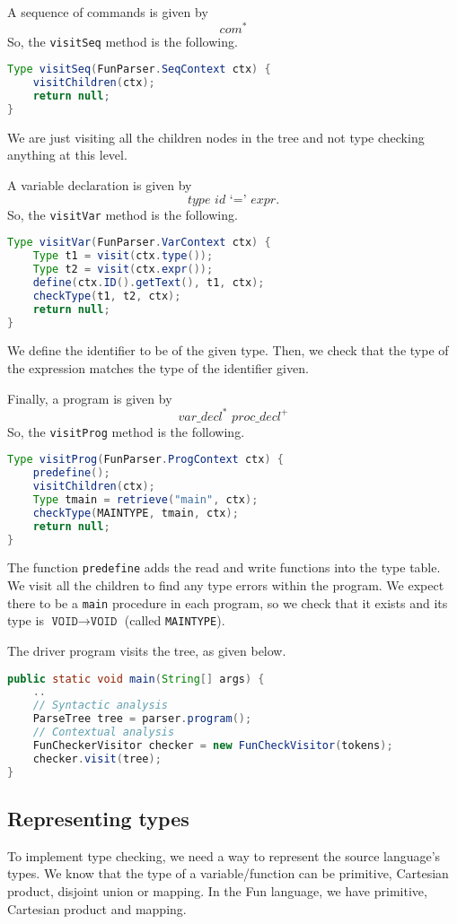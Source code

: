 \documentclass[a4paper, openany]{memoir}
\begin{document}
A sequence of commands is given by
\[\textit{com}^*\]
So, the \texttt{visitSeq} method is the following.
\begin{lstlisting}[language=java]
Type visitSeq(FunParser.SeqContext ctx) {
    visitChildren(ctx);
    return null;
}
\end{lstlisting}
We are just visiting all the children nodes in the tree and not type checking anything at this level.

A variable declaration is given by
\[\textit{type id} \text{ `}\texttt{=}\text{' } \textit{expr}.\]
So, the \texttt{visitVar} method is the following.
\begin{lstlisting}[language=java]
Type visitVar(FunParser.VarContext ctx) {
    Type t1 = visit(ctx.type());
    Type t2 = visit(ctx.expr());
    define(ctx.ID().getText(), t1, ctx);
    checkType(t1, t2, ctx);
    return null;
}
\end{lstlisting}
We define the identifier to be of the given type. Then, we check that the type of the expression matches the type of the identifier given.

Finally, a program is given by
\[\textit{var\_decl}^* \textit{ proc\_decl}^+ \]
So, the \texttt{visitProg} method is the following.
\begin{lstlisting}[language=java]
Type visitProg(FunParser.ProgContext ctx) {
    predefine();
    visitChildren(ctx);
    Type tmain = retrieve("main", ctx);
    checkType(MAINTYPE, tmain, ctx);
    return null;
}
\end{lstlisting}
The function \texttt{predefine} adds the read and write functions into the type table. We visit all the children to find any type errors within the program. We expect there to be a \texttt{main} procedure in each program, so we check that it exists and its type is $\texttt{VOID} \to \texttt{VOID}$ (called \texttt{MAINTYPE}).

The driver program visits the tree, as given below.
\begin{lstlisting}[language=java]
public static void main(String[] args) {
    ..
    // Syntactic analysis 
    ParseTree tree = parser.program();
    // Contextual analysis
    FunCheckerVisitor checker = new FunCheckVisitor(tokens);
    checker.visit(tree);
}
\end{lstlisting}

\subsection{Representing types}
To implement type checking, we need a way to represent the source language's types. We know that the type of a variable/function can be primitive, Cartesian product, disjoint union or mapping. In the Fun language, we have primitive, Cartesian product and mapping.
\end{document}
